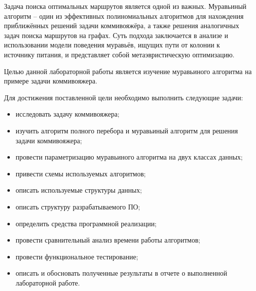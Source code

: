 \Introduction

\setcounter{page}{2}


Задача поиска оптимальных маршрутов является одной из важных.
Муравьиный алгоритм – один из эффективных полиномиальных алгоритмов для нахождения приближённых решений задачи коммивояжёра, а также решения аналогичных задач поиска маршрутов на графах. Суть подхода заключается в анализе и использовании модели поведения муравьёв, ищущих пути от колонии к источнику питания, и представляет собой метаэвристическую оптимизацию.

Целью данной лабораторной работы является изучение муравьиного алгоритма на примере задачи коммивояжера.

Для достижения поставленной цели необходимо выполнить следующие задачи:

\begin{itemize}
	\item исследовать задачу коммивояжера;
	\item изучить алгоритм полного перебора и муравьиный алгоритм для решения задачи коммивояжера;
	\item провести параметризацию муравьиного алгоритма на двух классах данных;
	\item привести схемы используемых алгоритмов;
	\item описать используемые структуры данных;
	\item описать структуру разрабатываемого ПО;
	\item определить средства программной реализации;
	\item провести сравнительный анализ времени работы алгоритмов;
	\item провести функциональное тестирование;
	\item описать и обосновать полученные результаты в отчете о выполненной лабораторной работе.
\end{itemize}





